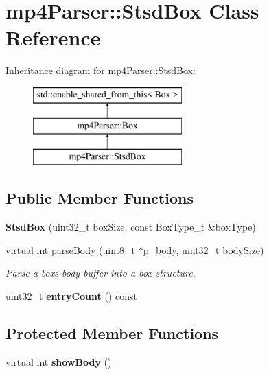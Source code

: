\hypertarget{classmp4_parser_1_1_stsd_box}{}\section{mp4\+Parser\+::Stsd\+Box Class Reference}
\label{classmp4_parser_1_1_stsd_box}
Inheritance diagram for mp4\+Parser\+::Stsd\+Box\+:\begin{figure}[H]
\begin{center}
\leavevmode
\includegraphics[height=3.000000cm]{classmp4_parser_1_1_stsd_box}
\end{center}
\end{figure}
\subsection*{Public Member Functions}
\begin{DoxyCompactItemize}
\item 
\mbox{\label{classmp4_parser_1_1_stsd_box_a751057dfc6564a218e8849f46588be32}} 
{\bfseries Stsd\+Box} (uint32\+\_\+t box\+Size, const Box\+Type\+\_\+t \&box\+Type)
\item 
virtual int \mbox{\hyperlink{classmp4_parser_1_1_stsd_box_af748ed2c67e55eddae676e4dab286a95}{parse\+Body}} (uint8\+\_\+t $\ast$p\+\_\+body, uint32\+\_\+t body\+Size)
\begin{DoxyCompactList}\small\item\em Parse a box\textquotesingle{}s body buffer into a box structure. \end{DoxyCompactList}\item 
\mbox{\label{classmp4_parser_1_1_stsd_box_a0c7e72921c090681f9cf44b296d8cd34}} 
uint32\+\_\+t {\bfseries entry\+Count} () const
\end{DoxyCompactItemize}
\subsection*{Protected Member Functions}
\begin{DoxyCompactItemize}
\item 
\mbox{\label{classmp4_parser_1_1_stsd_box_af71a2e59fc40dac7805f218c94da7c14}} 
virtual int {\bfseries show\+Body} ()
\end{DoxyCompactItemize}
